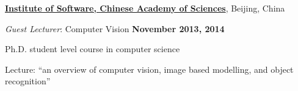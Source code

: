 \documentclass[10pt]{article}
\newcommand{\halfblankline}{\quad\vspace{-0.5\baselineskip}\pagebreak[3]}
\begin{document}
\href{http://www.asu.edu/}{\textbf{Institute of Software, Chinese Academy of Sciences}},
Beijing, China
\begin{outerlist}

\item[] \textit{Guest Lecturer}: Computer Vision
    \hfill \textbf{November 2013, 2014}
    \begin{innerlist}
        \item Ph.D. student level course in computer science
        \item Lecture: ``an overview of computer vision, image based modelling, and object recognition''
    \end{innerlist}

\end{outerlist}
%
%
%
%
%
\end{document}
